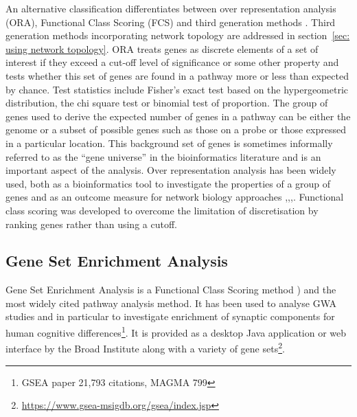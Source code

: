 An alternative classification differentiates between over representation analysis (ORA), Functional Class Scoring (FCS) and third generation methods \cite{khatri2012ten}\cite{mitrea2013methods}. Third generation methods incorporating network topology are addressed in section~\ref{sec: using network topology}. ORA treats genes as discrete elements of a set of interest if they exceed a cut-off level of significance or some other property and tests whether this set of genes are found in a pathway more or less than expected by chance. Test statistics include Fisher's exact test based on the hypergeometric distribution, the chi square test or binomial test of proportion.
The group of genes used to derive the expected number of genes in a pathway can be either the genome or a subset of possible genes such as those on a probe or those expressed in a particular location. This background set of genes is sometimes informally referred to as the ``gene universe'' in the bioinformatics literature \cite{kim2020netgo} and is an important aspect of the analysis\cite{rhee2008use}. Over representation analysis has been widely used, both as a bioinformatics tool to investigate the properties of a group of genes and as an outcome measure for network biology approaches \cite{ghiassian2015disease},\cite{mclean2016improved},\cite{barabasi2011network},\cite{rhee2008use}.  Functional class scoring was developed \cite{mootha2003pgc} to overcome the limitation of discretisation by ranking genes rather than using a cutoff\cite{zyla2017ranking}. 



\subsection{Gene Set Enrichment Analysis}
\label{sec:Gene set enrichment analysis}
 Gene Set Enrichment Analysis is a Functional Class Scoring method \cite{subramanian2005gene}) and the most widely cited pathway analysis method\parencite{zyla2017ranking}. It has been used to analyse GWA studies and in particular to investigate enrichment of synaptic components for human cognitive differences\cite{hill2014human}\footnote{GSEA paper 21,793 citations, MAGMA 799}. It is provided as a desktop Java application or web interface by the Broad Institute along with a variety of gene sets\footnote{\url{https://www.gsea-msigdb.org/gsea/index.jsp}}.

